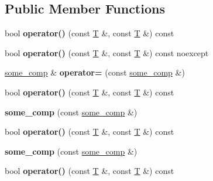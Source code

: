 \subsection*{Public Member Functions}
\begin{DoxyCompactItemize}
\item 
\mbox{\label{structsome__comp_a6a7124af43ee189c025dee7d7482eaba}} 
bool {\bfseries operator()} (const \mbox{\hyperlink{struct_t}{T}} \&, const \mbox{\hyperlink{struct_t}{T}} \&) const
\item 
\mbox{\label{structsome__comp_a362b090cf8ca4f094bf907b081a84781}} 
bool {\bfseries operator()} (const \mbox{\hyperlink{struct_t}{T}} \&, const \mbox{\hyperlink{struct_t}{T}} \&) const noexcept
\item 
\mbox{\label{structsome__comp_a3cf31772d92b1481d71121d650f28a01}} 
\mbox{\hyperlink{structsome__comp}{some\+\_\+comp}} \& {\bfseries operator=} (const \mbox{\hyperlink{structsome__comp}{some\+\_\+comp}} \&)
\item 
\mbox{\label{structsome__comp_a6a7124af43ee189c025dee7d7482eaba}} 
bool {\bfseries operator()} (const \mbox{\hyperlink{struct_t}{T}} \&, const \mbox{\hyperlink{struct_t}{T}} \&) const
\item 
\mbox{\label{structsome__comp_acb6b551db492c34e1354464e12b57857}} 
{\bfseries some\+\_\+comp} (const \mbox{\hyperlink{structsome__comp}{some\+\_\+comp}} \&)
\item 
\mbox{\label{structsome__comp_a6a7124af43ee189c025dee7d7482eaba}} 
bool {\bfseries operator()} (const \mbox{\hyperlink{struct_t}{T}} \&, const \mbox{\hyperlink{struct_t}{T}} \&) const
\item 
\mbox{\label{structsome__comp_acb6b551db492c34e1354464e12b57857}} 
{\bfseries some\+\_\+comp} (const \mbox{\hyperlink{structsome__comp}{some\+\_\+comp}} \&)
\item 
\mbox{\label{structsome__comp_a6a7124af43ee189c025dee7d7482eaba}} 
bool {\bfseries operator()} (const \mbox{\hyperlink{struct_t}{T}} \&, const \mbox{\hyperlink{struct_t}{T}} \&) const

\end{DoxyCompactItemize}
